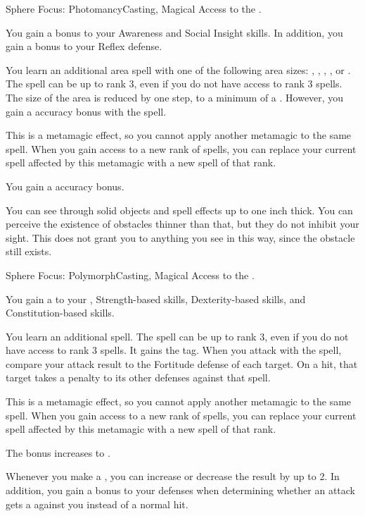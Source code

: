   \begin{magicalfeat}{Sphere Focus: Photomancy}{Casting, Magical}
    \featpre Access to the  .

     You gain a  bonus to your Awareness and Social Insight skills.
    In addition, you gain a  bonus to your Reflex defense.

     You learn an additional area spell with one of the following area sizes: \smallarea, \medarea, \largearea, \hugearea, or \gargarea.
    The spell can be up to rank 3, even if you do not have access to rank 3 spells.
    The size of the area is reduced by one step, to a minimum of a \tinyarea.
    However, you gain a  accuracy bonus with the spell.

    This is a metamagic effect, so you cannot apply another metamagic to the same spell.
    When you gain access to a new rank of spells, you can replace your current spell affected by this metamagic with a new spell of that rank.

     You gain a  accuracy bonus.

     You can see through solid objects and spell effects up to one inch thick.
    You can perceive the existence of obstacles thinner than that, but they do not inhibit your sight.
    This does not grant you  to anything you see in this way, since the obstacle still exists.
  \end{magicalfeat}

  \begin{magicalfeat}{Sphere Focus: Polymorph}{Casting, Magical}
    \featpre Access to the  .

     You gain a   to your , Strength-based skills, Dexterity-based skills, and Constitution-based skills.

     You learn an additional spell.
    The spell can be up to rank 3, even if you do not have access to rank 3 spells.
    It gains the \atLife tag.
    When you attack with the spell, compare your attack result to the Fortitude defense of each target.
    On a hit, that target takes a  penalty to its other defenses against that spell.

    This is a metamagic effect, so you cannot apply another metamagic to the same spell.
    When you gain access to a new rank of spells, you can replace your current spell affected by this metamagic with a new spell of that rank.

     The bonus increases to .

     Whenever you make a , you can increase or decrease the result by up to 2.
    In addition, you gain a  bonus to your defenses when determining whether an attack gets a  against you instead of a normal hit.
  \end{magicalfeat}

